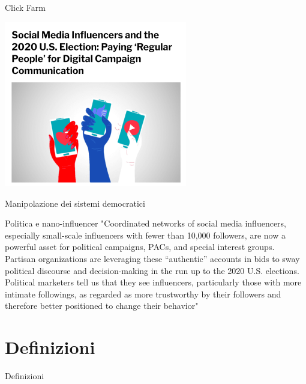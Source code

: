 \documentclass[11pt]{beamer}
\begin{document}
\begin{frame}{Click Farm \cite{social_nano}}

\begin{center}
\includegraphics[width=0.6\textwidth]{Pic/nano_influence_politics.png}
\end{center}

\end{frame}


\begin{frame}{Manipolazione dei sistemi democratici}
\begin{alertblock}{Politica e nano-influencer  \cite{social_nano}}
"Coordinated networks of social media influencers, especially small-scale influencers with fewer than 10,000 followers, are now a powerful asset for political campaigns, PACs, and special interest groups. Partisan organizations are leveraging these “authentic” accounts in bids to sway political discourse and decision-making in the run up to the 2020 U.S. elections. Political marketers tell us that they see influencers, particularly those with more intimate followings, as regarded as more trustworthy by their followers and therefore better positioned to change their behavior"
\end{alertblock}
\end{frame}



\section{Definizioni}

\begin{frame}
\begin{center}
\Huge
Definizioni
\end{center}
\end{frame}
\end{document}
